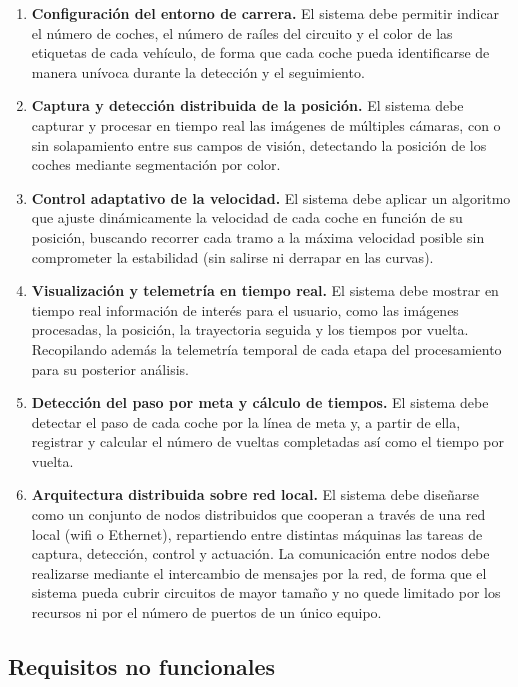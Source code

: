 \begin{enumerate}
    \item \textbf{Configuración del entorno de carrera.} El sistema debe permitir indicar el número de coches, el número de raíles del circuito y el color de las etiquetas de cada vehículo, de forma que cada coche pueda identificarse de manera unívoca durante la detección y el seguimiento.
    
    \item \textbf{Captura y detección distribuida de la posición.} El sistema debe capturar y procesar en tiempo real las imágenes de múltiples cámaras, con o sin solapamiento entre sus campos de visión, detectando la posición de los coches mediante segmentación por color.
    
    \item \textbf{Control adaptativo de la velocidad.} El sistema debe aplicar un algoritmo que ajuste dinámicamente la velocidad de cada coche en función de su posición, buscando recorrer cada tramo a la máxima velocidad posible sin comprometer la estabilidad (sin salirse ni derrapar en las curvas).
     
    \item \textbf{Visualización y telemetría en tiempo real.} El sistema debe mostrar en tiempo real información de interés para el usuario, como las imágenes procesadas, la posición, la trayectoria seguida y los tiempos por vuelta. Recopilando además la telemetría temporal de cada etapa del procesamiento para su posterior análisis.
    
    \item \textbf{Detección del paso por meta y cálculo de tiempos.} El sistema debe detectar el paso de cada coche por la línea de meta y, a partir de ella, registrar y calcular el número de vueltas completadas así como el tiempo por vuelta.
    
    \item \textbf{Arquitectura distribuida sobre red local.} El sistema debe diseñarse como un conjunto de nodos distribuidos que cooperan a través de una red local (wifi o Ethernet), repartiendo entre distintas máquinas las tareas de captura, detección, control y actuación. La comunicación entre nodos debe realizarse mediante el intercambio de mensajes por la red, de forma que el sistema pueda cubrir circuitos de mayor tamaño y no quede limitado por los recursos ni por el número de puertos de un único equipo.
\end{enumerate}

\subsection{Requisitos no funcionales}


